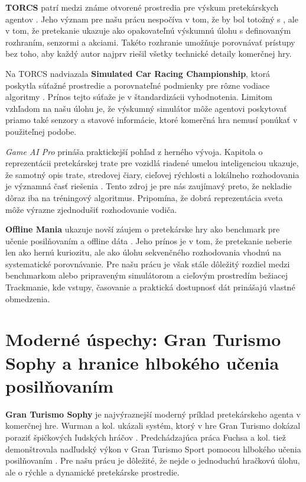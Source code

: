 \textbf{TORCS} patrí medzi známe otvorené prostredia pre výskum pretekárskych agentov \cite{wymann2000torcs}. Jeho význam pre našu prácu nespočíva v tom, že by bol totožný s \Trackmania{}, ale v tom, že pretekanie ukazuje ako opakovateľnú výskumnú úlohu s definovaným rozhraním, senzormi a akciami. Takéto rozhranie umožňuje porovnávať prístupy bez toho, aby každý autor najprv riešil všetky technické detaily komerčnej hry.

Na TORCS nadviazala \textbf{Simulated Car Racing Championship}, ktorá poskytla súťažné prostredie a porovnateľné podmienky pre rôzne vodiace algoritmy \cite{loiacono2010scrc}. Prínos tejto súťaže je v štandardizácii vyhodnotenia. Limitom vzhľadom na našu úlohu je, že výskumný simulátor môže agentovi poskytovať priamo také senzory a stavové informácie, ktoré komerčná hra nemusí ponúkať v použiteľnej podobe.

\emph{Game AI Pro} prináša praktickejší pohľad z herného vývoja. Kapitola o reprezentácii pretekárskej trate pre vozidlá riadené umelou inteligenciou ukazuje, že samotný opis trate, stredovej čiary, cieľovej rýchlosti a lokálneho rozhodovania je významná časť riešenia \cite{game_ai_pro_racetrack2013}. Tento zdroj je pre nás zaujímavý preto, že nekladie dôraz iba na tréningový algoritmus. Pripomína, že dobrá reprezentácia sveta môže výrazne zjednodušiť rozhodovanie vodiča.

\textbf{Offline Mania} ukazuje novší záujem o pretekárske hry ako benchmark pre učenie posilňovaním a offline dáta \cite{offline_mania2024}. Jeho prínos je v tom, že pretekanie neberie len ako hernú kuriozitu, ale ako úlohu sekvenčného rozhodovania vhodnú na systematické porovnávanie. Pre našu prácu je však stále dôležitý rozdiel medzi benchmarkom alebo pripraveným simulátorom a cieľovým prostredím bežiacej Trackmanie, kde vstupy, časovanie a praktická dostupnosť dát prinášajú vlastné obmedzenia.

\section[Gran Turismo Sophy]{Moderné úspechy: Gran Turismo Sophy a hranice hlbokého učenia posilňovaním}

\textbf{Gran Turismo Sophy} je najvýraznejší moderný príklad pretekárskeho agenta v komerčnej hre. Wurman a kol. ukázali systém, ktorý v hre Gran Turismo dokázal poraziť špičkových ľudských hráčov \cite{wurman2022gt_sophy}. Predchádzajúca práca Fuchsa a kol. tiež demonštrovala nadľudský výkon v Gran Turismo Sport pomocou hlbokého učenia posilňovaním \cite{gt_sport_drl_fuchs2021}. Pre našu prácu je dôležité, že nejde o jednoduchú hračkovú úlohu, ale o rýchle a dynamické pretekárske prostredie.

